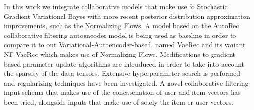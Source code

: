 In this work we integrate collaborative models that make use fo Stochastic Gradient
Variational Bayes with more recent posterior distribution approximation improvements,
such as the Normalizing Flows.
A model based on the AutoRec collaborative filtering autoencoder model is being
used as baseline in order to compare it to out Variational-Autoencoder-based, named VaeRec and
its variant NF-VaeRec which makes use of Normalizing Flows.
Modifications to gradient-based parameter update algorithms are intruduced
in order to take into account the sparsity of the data tensors.
Extensive hyperparameter search is performed and regularizing techniques have been investigated.
A novel collaborative filtering input schema that makes use of the concatenation of user and item vectors has been tried, alongside inputs that make use of solely the item or user vectors.
